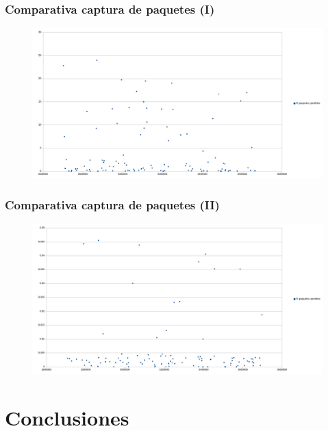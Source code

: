 \documentclass{beamer}
\begin{document}

\begin{frame}
\frametitle{Comparativa captura de paquetes (I)}

\begin{figure}[H]
	\centering
	\includegraphics[scale=0.25]{captura-libpcap-original.png}
	\label{libpcap}
\end{figure}

\end{frame}

\begin{frame}
\frametitle{Comparativa captura de paquetes (II)}

\begin{figure}[H]
	\centering
	\includegraphics[scale=0.25]{captura-libpcap-aware-pfring.png}
	\label{pfring}
\end{figure}

\end{frame}

\section{Conclusiones}
\end{document}
